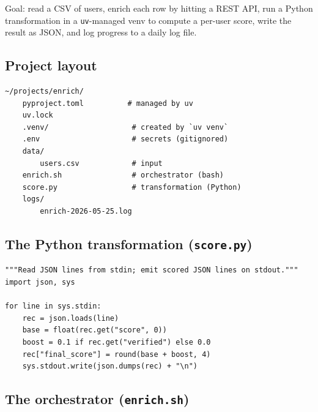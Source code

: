 \documentclass[11pt,a4paper]{article}
\begin{document}
Goal: read a CSV of users, enrich each row by hitting a REST API,
run a Python transformation in a \texttt{uv}-managed venv to compute
a per-user score, write the result as JSON, and log progress to a
daily log file.

\subsection*{Project layout}

\begin{lstlisting}[style=bashstyle]
~/projects/enrich/
    pyproject.toml          # managed by uv
    uv.lock
    .venv/                   # created by `uv venv`
    .env                     # secrets (gitignored)
    data/
        users.csv            # input
    enrich.sh                # orchestrator (bash)
    score.py                 # transformation (Python)
    logs/
        enrich-2026-05-25.log
\end{lstlisting}

\subsection*{The Python transformation (\texttt{score.py})}

\begin{lstlisting}[style=pystyle]
"""Read JSON lines from stdin; emit scored JSON lines on stdout."""
import json, sys

for line in sys.stdin:
    rec = json.loads(line)
    base = float(rec.get("score", 0))
    boost = 0.1 if rec.get("verified") else 0.0
    rec["final_score"] = round(base + boost, 4)
    sys.stdout.write(json.dumps(rec) + "\n")
\end{lstlisting}

\subsection*{The orchestrator (\texttt{enrich.sh})}
\end{document}
